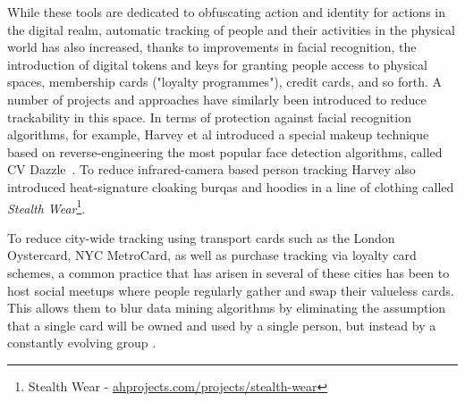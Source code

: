 \documentclass{IOS-Book-Article}     %
\newcommand{\tbox}[3][red]{{
\color{#1}\noindent{
   \fbox{\scriptsize{ {\bf #2} \textsl{#3}}}
   \vspace{2pt}
}
}}
\newcommand{\todo}[1]{\tbox{TODO:}{#1}}
\begin{document}
While these tools are dedicated to obfuscating action and identity for actions in the digital realm, automatic tracking of people and their activities in the physical world has also increased, thanks to improvements in facial recognition, the introduction of digital tokens and keys for granting people access to physical spaces, membership cards ("loyalty programmes"), credit cards, and so forth.  A number of projects and approaches have similarly been introduced to reduce trackability in this space.  In terms of protection against facial recognition algorithms, for example, Harvey et al introduced a special makeup technique based on reverse-engineering the most popular face detection algorithms, called CV Dazzle~\cite{harvey2012cv}. To reduce infrared-camera based person tracking Harvey also introduced heat-signature cloaking burqas and hoodies in a line of clothing called \emph{Stealth Wear}\footnote{Stealth Wear - \url{ahprojects.com/projects/stealth-wear}}.

To reduce city-wide tracking using transport cards such as the London Oystercard, NYC MetroCard, as well as  purchase tracking via loyalty card schemes, a common practice that has arisen in several of these cities has been to host social meetups where people regularly gather and swap their valueless cards.  This allows them to blur data mining algorithms by eliminating the assumption that a single card will be owned and used by a single person, but instead by a constantly evolving group \cite{lockton}.

% 

\end{document}
